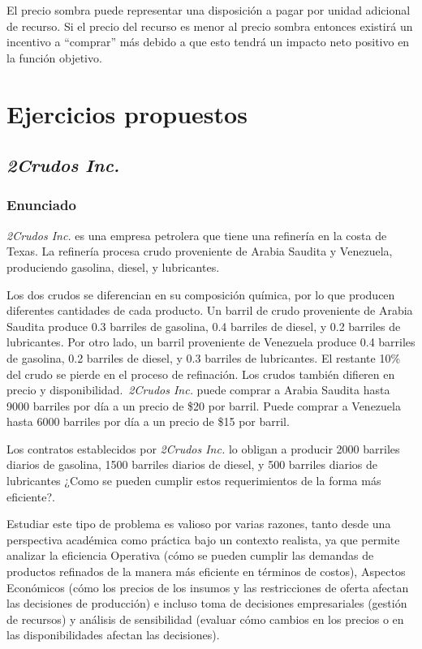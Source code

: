 \documentclass[conference]{IEEEtran}
\begin{document}
El precio sombra puede representar una disposición a pagar por unidad
adicional de recurso. Si el precio del recurso es menor al precio sombra
entonces existirá un incentivo a ``comprar'' más debido a que esto tendrá un
impacto neto positivo en la función objetivo.

\section{Ejercicios propuestos}

\subsection{\textit{2Crudos Inc.}}

\subsubsection{Enunciado}

\textit{2Crudos Inc.} es una empresa petrolera que tiene una refinería en
la costa de Texas. La refinería procesa crudo proveniente de Arabia Saudita y
Venezuela, produciendo gasolina, diesel, y lubricantes.

Los dos crudos se diferencian en su composición química, por lo que
producen diferentes cantidades de cada producto. Un barril de crudo
proveniente de Arabia Saudita produce 0.3 barriles de gasolina, 0.4 barriles
de diesel, y 0.2 barriles de lubricantes. Por otro lado, un barril proveniente
de Venezuela produce 0.4 barriles de gasolina, 0.2 barriles de diesel, y
0.3 barriles de lubricantes. El restante 10\% del crudo se pierde en el
proceso de refinación. Los crudos también difieren en precio y
disponibilidad.~\textit{2Crudos Inc.} puede comprar a Arabia Saudita hasta 9000
barriles por día a un precio de \$20 por barril. Puede comprar a Venezuela
hasta 6000 barriles por día a un precio de \$15 por barril.

Los contratos establecidos por \textit{2Crudos Inc.} lo obligan a producir 2000
barriles diarios de gasolina, 1500 barriles diarios de diesel, y 500
barriles diarios de lubricantes ¿Como se pueden cumplir estos requerimientos
de la forma más eficiente?.

Estudiar este tipo de problema es valioso por varias razones, tanto desde
una perspectiva académica como práctica bajo un contexto realista, ya que
permite analizar la eficiencia Operativa (cómo se pueden cumplir las
demandas de productos refinados de la manera más eficiente en términos
de costos), Aspectos Económicos (cómo los precios de los insumos y
las restricciones de oferta afectan las decisiones de producción) e
incluso toma de decisiones empresariales (gestión de recursos) y
análisis de sensibilidad (evaluar cómo cambios en los precios o en las
disponibilidades afectan las decisiones).
\end{document}

